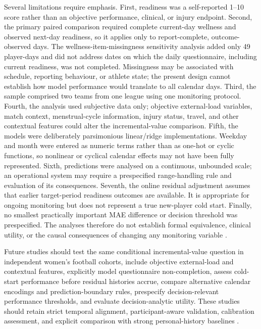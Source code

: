 Several limitations require emphasis. First, readiness was a self-reported 1--10 score rather than an objective performance, clinical, or injury endpoint. Second, the primary paired comparison required complete current-day wellness and observed next-day readiness, so it applies only to report-complete, outcome-observed days. The wellness-item-missingness sensitivity analysis added only 49 player-days and did not address dates on which the daily questionnaire, including current readiness, was not completed. Missingness may be associated with schedule, reporting behaviour, or athlete state; the present design cannot establish how model performance would translate to all calendar days. Third, the sample comprised two teams from one league using one monitoring protocol. Fourth, the analysis used subjective data only; objective external-load variables, match context, menstrual-cycle information, injury status, travel, and other contextual features could alter the incremental-value comparison. Fifth, the models were deliberately parsimonious linear/ridge implementations. Weekday and month were entered as numeric terms rather than as one-hot or cyclic functions, so nonlinear or cyclical calendar effects may not have been fully represented. Sixth, predictions were analysed on a continuous, unbounded scale; an operational system may require a prespecified range-handling rule and evaluation of its consequences. Seventh, the online residual adjustment assumes that earlier target-period readiness outcomes are available. It is appropriate for ongoing monitoring but does not represent a true new-player cold start. Finally, no smallest practically important MAE difference or decision threshold was prespecified. The analyses therefore do not establish formal equivalence, clinical utility, or the causal consequences of changing any monitoring variable \citep{Shmueli2010}.

Future studies should test the same conditional incremental-value question in independent women's football cohorts, include objective external-load and contextual features, explicitly model questionnaire non-completion, assess cold-start performance before residual histories accrue, compare alternative calendar encodings and prediction-boundary rules, prespecify decision-relevant performance thresholds, and evaluate decision-analytic utility. These studies should retain strict temporal alignment, participant-aware validation, calibration assessment, and explicit comparison with strong personal-history baselines \citep{Collins2024,Debray2023TRIPODCluster}.

